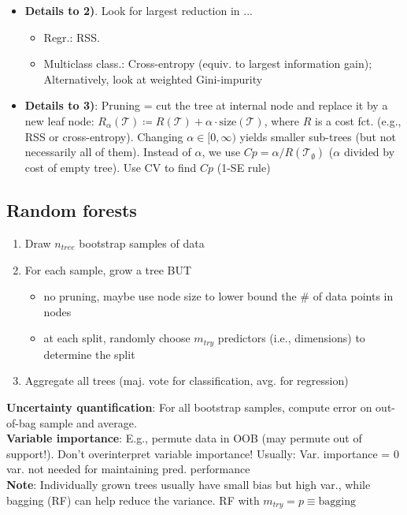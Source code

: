 \begin{itemize}
    \item \textbf{Details to 2)}. Look for largest reduction in ...
    \begin{itemize}
        \item Regr.: RSS.
        \item Multiclass class.: Cross-entropy (equiv. to largest information gain); Alternatively, look at weighted Gini-impurity
    \end{itemize}

    \item \textbf{Details to 3)}: Pruning = cut the tree at internal node and replace it by a new leaf node: $R_\alpha(\mathcal{T}) \coloneqq R(\mathcal{T}) + \alpha \cdot \text{size}(\mathcal{T})$, where $R$ is a cost fct. (e.g., RSS or cross-entropy). Changing $\alpha \in [0, \infty)$ yields smaller sub-trees (but not necessarily all of them). Instead of $\alpha$, we use $Cp = \alpha /R(\mathcal{T}_{\emptyset})$ ($\alpha$ divided by cost of empty tree). Use CV to find $Cp$ (1-SE rule) 
\end{itemize} 

\subsection*{Random forests}
\begin{enumerate}
    \item Draw $n_{tree}$ bootstrap samples of data
    \item For each sample, grow a tree BUT
    
    \begin{itemize}
        \item no pruning, maybe use node size to lower bound the \# of data points in nodes
        \item at each split, randomly choose $m_{try}$ predictors (i.e., dimensions) to determine the split
    \end{itemize}

    \item Aggregate all trees (maj. vote for classification, avg. for regression)
\end{enumerate}
\textbf{Uncertainty quantification}: For all bootstrap samples, compute error on out-of-bag sample and average. \\
\textbf{Variable importance}: E.g., permute data in OOB (may permute out of support!). Don't overinterpret variable importance! Usually: Var. importance = 0 \textrightarrow var. not needed for maintaining pred. performance \\
\textbf{Note}: Individually grown trees usually have small bias but high var., while bagging (RF) can help reduce the variance. RF with $m_{try}=p \equiv \text{bagging}$
